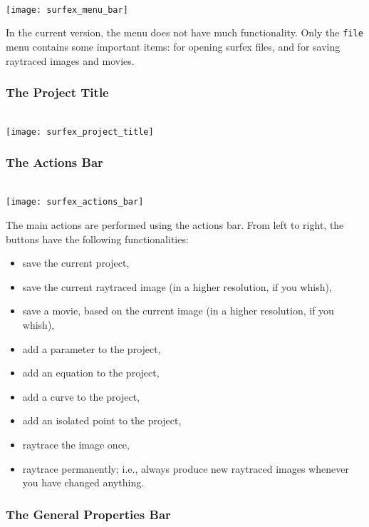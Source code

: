 \documentclass{article}
\newcommand{\surfex}{{\sc surfex}}
\begin{document}
\ \\\texttt{[image: surfex\_menu\_bar]}

In the current version, the menu does not have much functionality.
Only the {\tt file} menu contains some important items:
for opening \surfex{} files, and for saving raytraced images and movies.

%
\subsubsection{The Project Title}

\ \\\texttt{[image: surfex\_project\_title]}


%
\subsubsection{The Actions Bar}

\ \\\texttt{[image: surfex\_actions\_bar]}

The main actions are performed using the actions bar.
From left to right, the buttons have the following functionalities:
\begin{itemize}
\item save the current project,
\item save the current raytraced image (in a higher resolution, if you whish),
\item save a movie, based on the current image (in a higher resolution, if you whish),
\item add a parameter to the project,
\item add an equation to the project,
\item add a curve to the project,
\item add an isolated point to the project,
\item raytrace the image once,
\item raytrace permanently; i.e., always produce new raytraced images whenever
  you have changed anything.
\end{itemize}


\subsubsection{The General Properties Bar}
\end{document}

